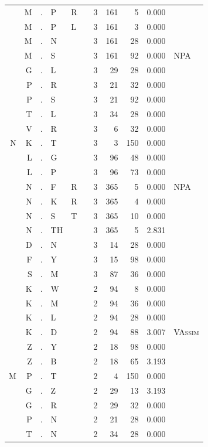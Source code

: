 \documentclass[12pt]{article}
\begin{document}
\begin{longtable}{r@{ } r@{ } c@{ } l@{ } l@{ } l@{ } r r r r l }
 & M & . & P & R &  & 3 & 161 & 5 & 0.000 &  \\
 & M & . & P & L &  & 3 & 161 & 3 & 0.000 &  \\
 & M & . & N &  &  & 3 & 161 & 28 & 0.000 &  \\
 & M & . & S &  &  & 3 & 161 & 92 & 0.000 & \textsc{NPA} \\
 & G & . & L &  &  & 3 & 29 & 28 & 0.000 &  \\
 & P & . & R &  &  & 3 & 21 & 32 & 0.000 &  \\
 & P & . & S &  &  & 3 & 21 & 92 & 0.000 &  \\
 & T & . & L &  &  & 3 & 34 & 28 & 0.000 &  \\
 & V & . & R &  &  & 3 & 6 & 32 & 0.000 &  \\
N & K & . & T &  &  & 3 & 3 & 150 & 0.000 &  \\
 & L & . & G &  &  & 3 & 96 & 48 & 0.000 &  \\
 & L & . & P &  &  & 3 & 96 & 73 & 0.000 &  \\
 & N & . & F & R &  & 3 & 365 & 5 & 0.000 & \textsc{NPA} \\
 & N & . & K & R &  & 3 & 365 & 4 & 0.000 &  \\
 & N & . & S & T &  & 3 & 365 & 10 & 0.000 &  \\
 & N & . & TH &  &  & 3 & 365 & 5 & 2.831 &  \\
 & D & . & N &  &  & 3 & 14 & 28 & 0.000 &  \\
 & F & . & Y &  &  & 3 & 15 & 98 & 0.000 &  \\
 & S & . & M &  &  & 3 & 87 & 36 & 0.000 &  \\
 & K & . & W &  &  & 2 & 94 & 8 & 0.000 &  \\
 & K & . & M &  &  & 2 & 94 & 36 & 0.000 &  \\
 & K & . & L &  &  & 2 & 94 & 28 & 0.000 &  \\
 & K & . & D &  &  & 2 & 94 & 88 & 3.007 & \textsc{VAssim} \\
 & Z & . & Y &  &  & 2 & 18 & 98 & 0.000 &  \\
 & Z & . & B &  &  & 2 & 18 & 65 & 3.193 &  \\
M & P & . & T &  &  & 2 & 4 & 150 & 0.000 &  \\
 & G & . & Z &  &  & 2 & 29 & 13 & 3.193 &  \\
 & G & . & R &  &  & 2 & 29 & 32 & 0.000 &  \\
 & P & . & N &  &  & 2 & 21 & 28 & 0.000 &  \\
 & T & . & N &  &  & 2 & 34 & 28 & 0.000 &  \\

\end{longtable}
\end{document}
